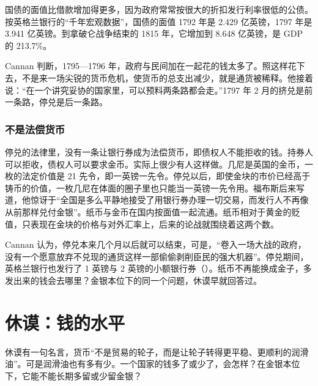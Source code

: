 国债的面值比借款增加得更多，因为政府常常按很大的折扣发行利率很低的公债\cite{cannan1919}。按英格兰银行的“千年宏观数据”，国债的面值 1792 年是 2.429 亿英镑，1797 年是 3.941 亿英镑。到拿破仑战争结束的 1815 年，它增加到 8.648 亿英镑，是 GDP 的 213.7\%\cite{boe2017,mitchell1988}。

Cannan 判断，1795—1796 年，政府与民间加在一起花的钱太多了。照这样花下去，不是来一场尖锐的货币危机，使货币的总支出减少，就是通货被稀释。他接着说：“在一个讲究妥协的国家里，可以预料两条路都会走。”\cite{cannan1919}1797 年 2 月的挤兑是前一条路，停兑是后一条路。

\subsubsection{不是法偿货币}
停兑的法律里，没有一条让银行券成为法偿货币，即债权人不能拒收的钱\cite{cannan1919}。持券人可以拒收，债权人可以要求金币。实际上很少有人这样做。几尼是英国的金币，一枚的法定价值是 21 先令，即一英镑一先令。停兑以后，即使金块的市价已经高于铸币的价值，一枚几尼在体面的圈子里也只能当一英镑一先令用\cite{cannan1919}。福布斯后来写道，他惊讶于“全国是多么平静地接受了用银行券办理一切交易，而发行人不再像从前那样兑付金银”\cite{cannan1919}。纸币与金币在国内按面值一起流通。纸币相对于黄金的贬值，只表现在金块的价格与对外汇率上，后来的论战就围绕着这两个数。

Cannan 认为，停兑本来几个月以后就可以结束，可是，“卷入一场大战的政府，没有一个愿意放弃不兑现的通货这样一部偷偷剥削臣民的强大机器”\cite{cannan1919}。停兑期间，英格兰银行也发行了 1 英镑与 2 英镑的小额银行券（）。纸币不再能换成金子，多发出来的钱会去哪里？金银本位下的同一个问题，休谟早就回答过。


\section{休谟：钱的水平}\label{sec:bullion-hume}

休谟有一句名言，货币“不是贸易的轮子，而是让轮子转得更平稳、更顺利的润滑油”\cite{hume1752}。可是润滑油也有多有少。一个国家的钱多了或少了，会怎样？在金银本位下，它能不能长期多留或少留金银？

